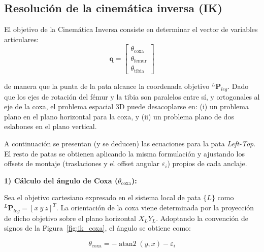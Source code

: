 \subsection{Resolución de la cinemática inversa (IK)}
\label{subsec:theory_ik}

El objetivo de la Cinemática Inversa consiste en determinar el vector de variables articulares:
\begin{equation}
    \bm{q} =
    \begin{bmatrix}
        \theta_{\text{coxa}} \\ \theta_{\text{femur}} \\ \theta_{\text{tibia}}
    \end{bmatrix}
\end{equation}

de manera que la punta de la pata alcance la coordenada objetivo ${}^{L}\bm{P}_{leg}$. Dado que los ejes de rotación del fémur y la tibia son paralelos entre sí, y ortogonales al eje de la coxa, el problema espacial 3D puede desacoplarse en: (i) un problema plano en el plano horizontal para la coxa, y (ii) un problema plano de dos eslabones en el plano vertical.


A continuación se presentan (y se deducen) las ecuaciones para la pata \textit{Left-Top}. El resto de patas se obtienen aplicando la misma formulación y ajustando los offsets de montaje (traslaciones y el offset angular $\varepsilon_i$) propios de cada anclaje.

\textbf{1) Cálculo del ángulo de Coxa ($\theta_{\text{coxa}}$):}

Sea el objetivo cartesiano expresado en el sistema local de pata $\{L\}$ como ${}^{L}\bm{P}_{leg}=[x\ y\ z]^T$. La orientación de la coxa viene determinada por la proyección de dicho objetivo sobre el plano horizontal $X_LY_L$. Adoptando la convención de signos de la Figura~\ref{fig:ik_coxa}, el ángulo se obtiene como:

\vspace{-1\baselineskip}
\begin{equation}
    \theta_{\text{coxa}} = -\operatorname{atan2}(y, x) - \varepsilon_i
    \label{eq:ik_theta}
\end{equation}
\vspace{-1\baselineskip}

